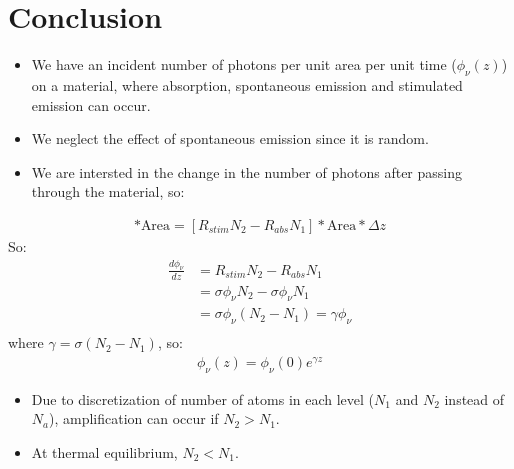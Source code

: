 \documentclass[11pt]{article}
\begin{document}
\section{Conclusion}
\begin{itemize}
    \item We have an incident number of photons per unit area per unit time ($\phi_{\nu}(z)$) on a material, where absorption, spontaneous emission and stimulated emission can occur.
    \item We neglect the effect of spontaneous emission since it is random.
    \item We are intersted in the change in the number of photons after passing through the material, so:
\end{itemize}
\begin{align*}
    [\phi_{\nu}(z + \Delta z) - \phi_{\nu}(z)] * \text{Area} = [R_{stim}N_2 - R_{abs}N_1] * \text{Area} * \Delta z
\end{align*}
So:
\begin{align*}
    \frac{d\phi_{\nu}}{dz} &= R_{stim}N_2 - R_{abs}N_1 \\
    &= \sigma \phi_{\nu} N_2 - \sigma \phi_{\nu} N_1 \\
    &= \sigma \phi_{\nu} (N_2 - N_1) = \gamma \phi_{\nu} \\
\end{align*}
where $\gamma = \sigma (N_2 - N_1)$, so:
\begin{align*}
    \phi_{\nu}(z) = \phi_{\nu}(0) e^{\gamma z}
\end{align*}
\begin{itemize}
    \item Due to discretization of number of atoms in each level ($N_1$ and $N_2$ instead of $N_a$), amplification can occur if $N_2 > N_1$.
    \item At thermal equilibrium, $N_2 < N_1$.
\end{itemize}
\end{document}
